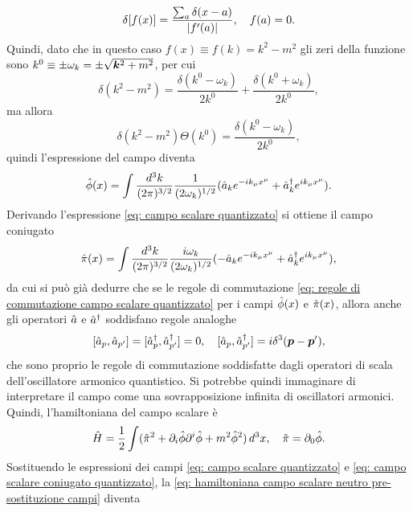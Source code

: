 \begin{equation}
    \delta[f(x)] = \frac{\sum\nolimits_a\delta(x - a)}{|f'(a)|},\quad f(a) = 0.
\end{equation}
Quindi, dato che in questo caso $f(x) \equiv f(k) = k^2 - m^2$ gli zeri della funzione sono $k^0 \equiv \pm\omega_k = \pm\sqrt{\bm{k}^2 + m^2}$, per cui
\begin{equation}
    \delta(k^2 - m^2) = \frac{\delta(k^0 - \omega_k)}{2k^0} + \frac{\delta(k^0 + \omega_k)}{2k^0},
\end{equation}
ma allora 
\begin{equation}
    \delta(k^2 - m^2)\Theta(k^0) = \frac{\delta(k^0 - \omega_k)}{2k^0},
\end{equation}
quindi l'espressione del campo diventa
\begin{equation}
\label{eq: campo scalare quantizzato}
    \hat{\phi}(x) = \int\frac{d^3k}{(2\pi)^{3/2}}\frac{1}{(2\omega_k)^{1/2}}(\hat{a}_ke^{-ik_\mu x^\mu} + \hat{a}_k^\dagger e^{ik_\mu x^\mu}).
\end{equation}
Derivando l'espressione \eqref{eq: campo scalare quantizzato} si ottiene il campo coniugato 
\begin{equation}
\label{eq: campo scalare coniugato quantizzato}
    \hat{\pi}(x) = \int\frac{d^3k}{(2\pi)^{3/2}}\frac{i\omega_k}{(2\omega_k)^{1/2}}(-\hat{a}_ke^{-ik_\mu x^\mu} + \hat{a}^\dagger_k e^{ik_\mu x^\mu}),
\end{equation}
da cui si può già dedurre che se le regole di commutazione \eqref{eq: regole di commutazione campo scalare quantizzato} per i campi $\hat{\phi}(x)$ e $\hat{\pi}(x)$, allora anche gli operatori $\hat{a}$ e $\hat{a}^\dagger$ soddisfano regole analoghe
\begin{equation}
\label{eq: regole commutazione operatori a campo scalare}
    [\hat{a}_p,\hat{a}_{p'}] = [\hat{a}^\dagger_p,\hat{a}^\dagger_{p'}] = 0,\quad[\hat{a}_p,\hat{a}^\dagger_{p'}] = i\delta^3(\bm{p} - \bm{p}'),
\end{equation}
che sono proprio le regole di commutazione soddisfatte dagli operatori di scala dell'oscillatore armonico quantistico. Si potrebbe quindi immaginare di interpretare il campo come una sovrapposizione infinita di oscillatori armonici. Quindi, l'hamiltoniana del campo scalare è
\begin{equation}
\label{eq: hamiltoniana campo scalare neutro pre-sostituzione campi}
    \hat{H} = \frac{1}{2}\int(\hat{\pi}^2 + \partial_i\hat{\phi}\partial^i\hat{\phi} + m^2\hat{\phi}^2)\,d^3x,\quad\hat{\pi}=\partial_0\hat{\phi}.
\end{equation}
Sostituendo le espressioni dei campi \eqref{eq: campo scalare quantizzato} e \eqref{eq: campo scalare coniugato quantizzato}, la \eqref{eq: hamiltoniana campo scalare neutro pre-sostituzione campi} diventa
